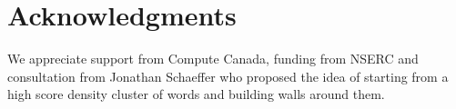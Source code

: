 \section{Acknowledgments}

We appreciate support from Compute Canada, funding from NSERC and consultation from Jonathan Schaeffer who proposed the idea of starting from a high score density cluster of words and building walls around them.